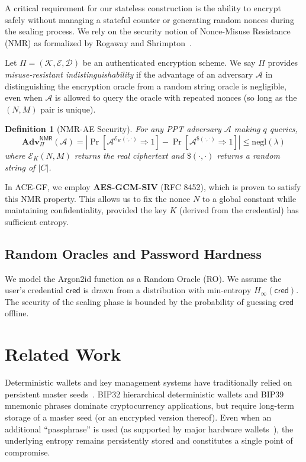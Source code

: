 \documentclass[12pt,a4paper]{article}
\newtheorem{definition}{Definition}
\begin{document}
  A critical requirement for our stateless construction is the ability to encrypt safely without managing a stateful counter or generating random nonces during the sealing process. We rely on the security notion of Nonce-Misuse Resistance (NMR) as formalized by Rogaway and Shrimpton~\cite{rogaway2006deterministic}.

  Let $\Pi = (\mathcal{K}, \mathcal{E}, \mathcal{D})$ be an authenticated encryption scheme. We say $\Pi$ provides \emph{misuse-resistant indistinguishability} if the advantage of an adversary $\mathcal{A}$ in distinguishing the encryption oracle from a random string oracle is negligible, even when $\mathcal{A}$ is allowed to query the oracle with repeated nonces (so long as the $(N, M)$ pair is unique).

  \begin{definition}[NMR-AE Security]
   For any PPT adversary $\mathcal{A}$ making $q$ queries,
   \[
  \mathbf{Adv}_{\Pi}^{\mathsf{NMR}}(\mathcal{A}) = \left| \Pr[\mathcal{A}^{\mathcal{E}_K(\cdot, \cdot)} \Rightarrow 1] - \Pr[\mathcal{A}^{\$(\cdot, \cdot)} \Rightarrow 1] \right| \le \text{negl}(\lambda)
   \]
   where $\mathcal{E}_K(N, M)$ returns the real ciphertext and $\$(\cdot, \cdot)$ returns a random string of $|C|$.
  \end{definition}

  In ACE-GF, we employ \textbf{AES-GCM-SIV} (RFC 8452), which is proven to satisfy this NMR property. This allows us to fix the nonce $N$ to a global constant while maintaining confidentiality, provided the key $K$ (derived from the credential) has sufficient entropy.

  \subsection{Random Oracles and Password Hardness}
  We model the Argon2id function as a Random Oracle (RO). We assume the user's credential $\mathsf{cred}$ is drawn from a distribution with min-entropy $H_\infty(\mathsf{cred})$. The security of the sealing phase is bounded by the probability of guessing $\mathsf{cred}$ offline.

  \section{Related Work}\label{sec:related}

  Deterministic wallets and key management systems have traditionally relied on persistent master seeds~\cite{bip39,bip32}. BIP32 hierarchical deterministic wallets and BIP39 mnemonic phrases dominate cryptocurrency applications, but require long-term storage of a master seed (or an encrypted version thereof). Even when an additional ``passphrase'' is used (as supported by major hardware wallets~\cite{ledger-passphrase,trezor-passphrase}), the underlying entropy remains persistently stored and constitutes a single point of compromise.
\end{document}
